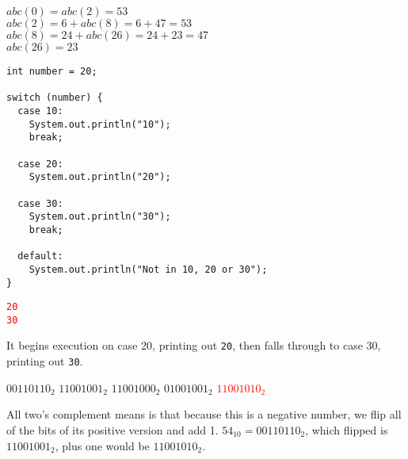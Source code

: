 \documentclass[11pt,addpoints]{exam}
\begin{document}
\begin{questions}
\begin{minipage}{\textwidth}
$abc(0) = abc(2) = 53$ \\
$abc(2) = 6 + abc(8) = 6 + 47 = 53$ \\
$abc(8) = 24 + abc(26) = 24 + 23 = 47$ \\
$abc(26) = 23$ \\

\end{minipage}

\begin{minipage}{\textwidth}

\begin{verbatim}
int number = 20;

switch (number) {
  case 10:
    System.out.println("10");
    break;

  case 20:
    System.out.println("20");

  case 30:
    System.out.println("30");
    break;

  default:
    System.out.println("Not in 10, 20 or 30");
}
\end{verbatim}

\begin{choices}
  \choice \textcolor{red}{\tt 20\\30}
   \\
\end{choices}

It begins execution on case 20, printing out {\tt 20}, then falls through to case 30, printing out {\tt 30}. \\

\end{minipage}

\begin{minipage}{\textwidth}

\begin{choices}
  \choice $00110110_{2}$
  \choice $11001001_{2}$
  \choice $11001000_{2}$
  \choice $01001001_{2}$
  \choice \textcolor{red}{$11001010_{2}$} \\
\end{choices}

  All two's complement means is that because this is a negative number, we flip all of the bits of its positive version and add 1. $54_{10} = 00110110_{2}$, which flipped is $11001001_{2}$, plus one would be $11001010_{2}$. \\


\end{minipage}
\end{questions}
\end{document}
